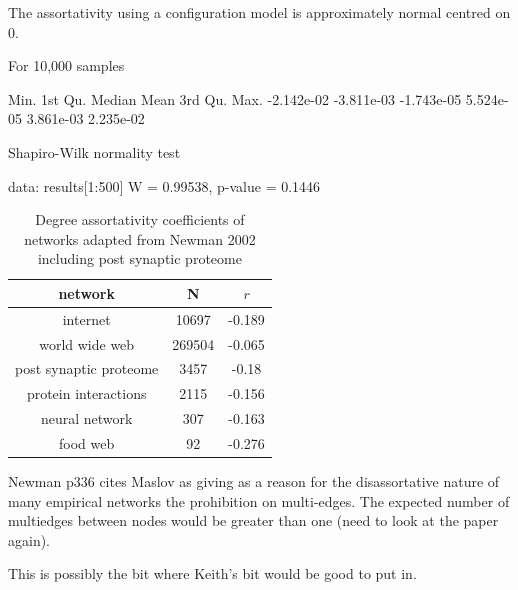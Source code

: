 The assortativity using a configuration model  is approximately normal centred on 0.

For 10,000 samples   

Min.    1st Qu.     Median       Mean    3rd Qu.       Max. 
-2.142e-02 -3.811e-03 -1.743e-05  5.524e-05  3.861e-03  2.235e-02 

Shapiro-Wilk normality test

data:  results[1:500]
W = 0.99538, p-value = 0.1446


\begin{table}[]
    \centering
    \begin{tabular}{c|c|c}
       network  &N& $r$  \\
       \hline
       internet & 10697&-0.189\\
       world wide web &269504 & -0.065\\
       post synaptic proteome & 3457 & -0.18\\
       protein interactions & 2115 & -0.156\\
       neural network & 307 & -0.163\\
       food web & 92 & -0.276 \\
       
       
         
    \end{tabular}
    \caption{Degree assortativity coefficients of networks adapted from Newman 2002 \cite{newman2002assortative} including post synaptic proteome}
    \label{Table:DegreeAssortativityNewman}
\end{table}

 


Newman \cite{newman2018networks} p336 cites Maslov \cite{maslov2004detection} as giving as a reason for the disassortative nature of many empirical networks the prohibition on multi-edges. The expected number of multiedges between nodes would be greater than one (need to look at the paper again).

This is possibly the bit where Keith's bit would be good to put in.  
%
%
%

